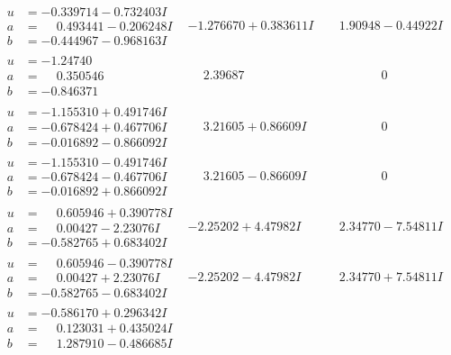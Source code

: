 \documentclass[1p]{elsarticle_modified}
\theoremstyle{definition}
\begin{document}
$$\begin{array}{c|c|c}
\begin{aligned}
u &= -0.339714 - 0.732403 I \\
a &= \phantom{-}0.493441 - 0.206248 I \\
b &= -0.444967 - 0.968163 I\end{aligned}
 & -1.276670 + 0.383611 I & \phantom{-}1.90948 - 0.44922 I \\ \hline\begin{aligned}
u &= -1.24740\phantom{ +0.000000I} \\
a &= \phantom{-}0.350546\phantom{ +0.000000I} \\
b &= -0.846371\phantom{ +0.000000I}\end{aligned}
 & \phantom{-}2.39687\phantom{ +0.000000I} & \phantom{-0.000000 } 0 \\ \hline\begin{aligned}
u &= -1.155310 + 0.491746 I \\
a &= -0.678424 + 0.467706 I \\
b &= -0.016892 - 0.866092 I\end{aligned}
 & \phantom{-}3.21605 + 0.86609 I & \phantom{-0.000000 } 0 \\ \hline\begin{aligned}
u &= -1.155310 - 0.491746 I \\
a &= -0.678424 - 0.467706 I \\
b &= -0.016892 + 0.866092 I\end{aligned}
 & \phantom{-}3.21605 - 0.86609 I & \phantom{-0.000000 } 0 \\ \hline\begin{aligned}
u &= \phantom{-}0.605946 + 0.390778 I \\
a &= \phantom{-}0.00427 - 2.23076 I \\
b &= -0.582765 + 0.683402 I\end{aligned}
 & -2.25202 + 4.47982 I & \phantom{-}2.34770 - 7.54811 I \\ \hline\begin{aligned}
u &= \phantom{-}0.605946 - 0.390778 I \\
a &= \phantom{-}0.00427 + 2.23076 I \\
b &= -0.582765 - 0.683402 I\end{aligned}
 & -2.25202 - 4.47982 I & \phantom{-}2.34770 + 7.54811 I \\ \hline\begin{aligned}
u &= -0.586170 + 0.296342 I \\
a &= \phantom{-}0.123031 + 0.435024 I \\
b &= \phantom{-}1.287910 - 0.486685 I\end{aligned}

\end{array}$$
\end{document}
